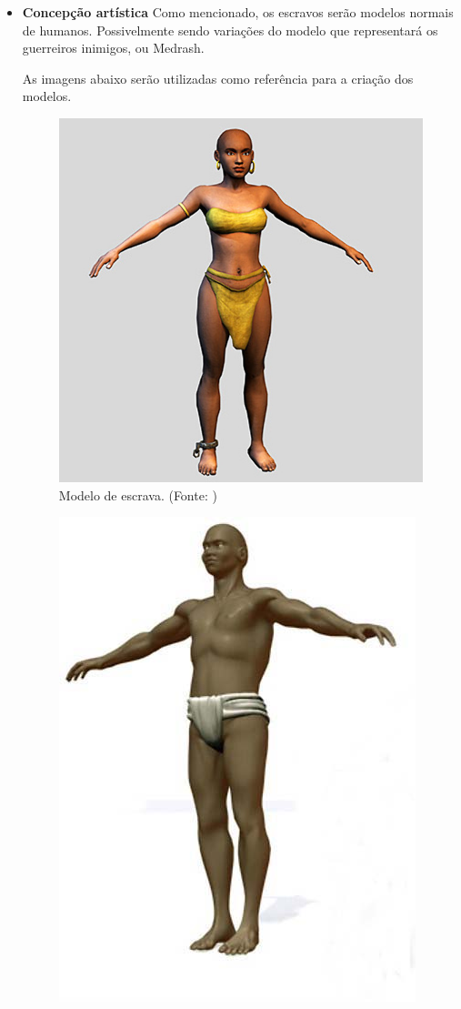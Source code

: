 \begin{itemize}
\item{\bf Concepção artística}
Como mencionado, os escravos serão modelos normais de humanos. Possivelmente sendo variações do modelo que representará os guerreiros inimigos, ou Medrash.


As imagens abaixo serão utilizadas como referência para a criação dos modelos.

\begin{figure}[H]
 \centering
 \includegraphics[scale=0.5]{Imagens/mulher01.png}
 \caption{Modelo de escrava. (Fonte: \cite{bib:escrava01})}
\label{img:mulher}
\end{figure}
\newpage
\begin{figure}[H]
 \centering
 \includegraphics[scale=0.5]{Imagens/escravo01.png}

\end{figure}
\end{itemize}
